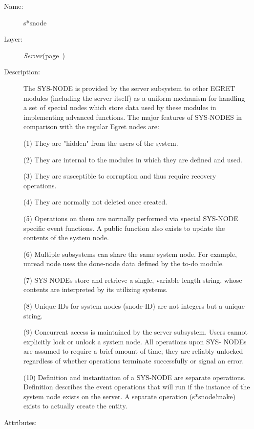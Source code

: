 \begin{description}
\item [Name:]  s*snode

\item [Layer:]
{\sl Server}\hfill(page~\pageref{Server})

\item [Description:]

The SYS-NODE is provided by the server subsystem to other EGRET modules
(including the server itself) as a uniform mechanism for handling a set
of special nodes which store data used by these modules in implementing
advanced functions. The major features of SYS-NODES in comparison with
the regular Egret nodes are:

(1)  They are "hidden" from the users of the system.

(2)  They are internal to the modules in which they are defined
     and used.

(3)  They are susceptible to corruption and thus require recovery 
     operations.

(4)  They are normally not deleted once created.

(5)  Operations on them are normally performed via special SYS-NODE
     specific event functions. A public function also exists to
     update the contents of the system node.
 
(6)  Multiple subsystems can share the same system node. For example,
     unread node uses the done-node data defined by the to-do module.

(7)  SYS-NODEs store and retrieve a single, variable length string,
     whose contents are interpreted by its utilizing systems.

(8)  Unique IDs for system nodes (snode-ID) are not integers but a unique
     string.
 
(9)  Concurrent access is maintained by the server subsystem. Users cannot
     explicitly lock or unlock a system node. All operations upon SYS-
     NODEs are assumed to require a brief amount of time; they are 
     reliably unlocked regardless of whether operations terminate 
     successfully or signal an error.

(10) Definition and instantiation of a SYS-NODE are separate
     operations. Definition describes the event operations that will 
     run if the instance of the system node exists on the server. A 
     separate operation (s*snode!make) exists to actually create 
     the entity. 

\item [Attributes:]


\end{description}
